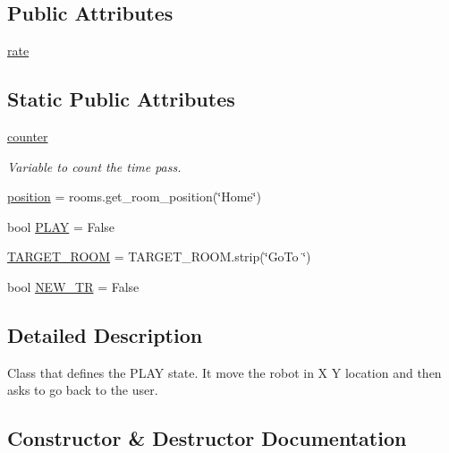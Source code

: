 \subsection*{Public Attributes}
\begin{DoxyCompactItemize}
\item 
\hyperlink{classcm2_1_1Play_a4f8427d5a6c4eaeaa0e171879dbf6b21}{rate}
\end{DoxyCompactItemize}
\subsection*{Static Public Attributes}
\begin{DoxyCompactItemize}
\item 
\hyperlink{classcm2_1_1Play_a93ae6781b2c6899b3baaff6a1e85b993}{counter}
\begin{DoxyCompactList}\small\item\em Variable to count the time pass. \end{DoxyCompactList}\item 
\hyperlink{classcm2_1_1Play_a7d95099e35917fe5d3954cb6ba02a07d}{position} = rooms.\+get\+\_\+room\+\_\+position(\char`\"{}Home\char`\"{})
\item 
bool \hyperlink{classcm2_1_1Play_a7c234a400b24301b31af0bd23d48e3f7}{P\+L\+AY} = False
\item 
\hyperlink{classcm2_1_1Play_a04801b2166d02c4d58ad8a12ec71dafd}{T\+A\+R\+G\+E\+T\+\_\+\+R\+O\+OM} = T\+A\+R\+G\+E\+T\+\_\+\+R\+O\+O\+M.\+strip(\char`\"{}Go\+To \char`\"{})
\item 
bool \hyperlink{classcm2_1_1Play_ac55ece5d83e26bbc6d388510349c2b85}{N\+E\+W\+\_\+\+TR} = False
\end{DoxyCompactItemize}


\subsection{Detailed Description}
\begin{DoxyVerb}Class that defines the PLAY state. 
 It move the robot in X Y location and then asks to go back to the user.\end{DoxyVerb}
 

\subsection{Constructor \& Destructor Documentation}
